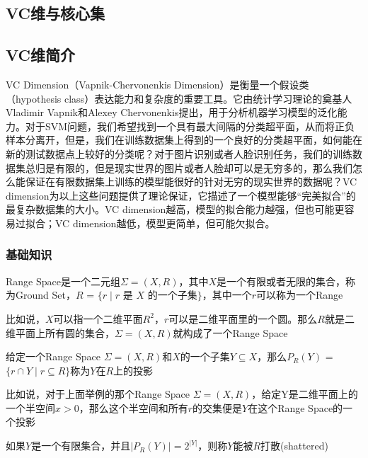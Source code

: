 \documentclass[lang=cn,newtx,10pt,scheme=chinese,chinesefont=nofont,citestyle=gb7714-2015, bibstyle=gb7714-2015]{elegantbook}
\begin{document}
\begin{refsection}
\chapter{VC维与核心集}
\section{VC维简介}
VC Dimension（Vapnik-Chervonenkis Dimension）是衡量一个假设类（hypothesis class）表达能力和复杂度的重要工具。它由统计学习理论的奠基人Vladimir Vapnik和Alexey Chervonenkis提出\cite{vapnik1971theory}，用于分析机器学习模型的泛化能力。对于SVM问题，我们希望找到一个具有最大间隔的分类超平面，从而将正负样本分离开，但是，我们在训练数据集上得到的一个良好的分类超平面，如何能在新的测试数据点上较好的分类呢？对于图片识别或者人脸识别任务，我们的训练数据集总归是有限的，但是现实世界的图片或者人脸却可以是无穷多的，那么我们怎么能保证在有限数据集上训练的模型能很好的针对无穷的现实世界的数据呢？VC dimension为以上这些问题提供了理论保证，它描述了一个模型能够“完美拟合”的最复杂数据集的大小。VC dimension越高，模型的拟合能力越强，但也可能更容易过拟合；VC dimension越低，模型更简单，但可能欠拟合。


\subsection{基础知识}

\begin{definition}
    Range Space是一个二元组$\Sigma = (X,R)$，其中$X$是一个有限或者无限的集合，称为Ground Set，$R$ = $\{ r \mid r \text{ 是 } X \text{ 的一个子集} \}$，其中一个$r$可以称为一个Range
\end{definition}

比如说，$X$可以指一个二维平面$R^2$，$r$可以是二维平面里的一个圆。那么$R$就是二维平面上所有圆的集合，$\Sigma = (X,R)$就构成了一个Range Space

\begin{definition}[投影]
    给定一个Range Space $\Sigma = (X,R)$和$X$的一个子集$Y \subseteq X$，那么$P_R(Y)$ = $\{ r \cap Y \mid r \subseteq R \}$称为$Y$在$R$上的投影
\end{definition}

比如说，对于上面举例的那个Range Space $\Sigma = (X,R)$，给定Y是二维平面上的一个半空间$x > 0$，那么这个半空间和所有$r$的交集便是$Y$在这个Range Space的一个投影

\begin{definition}[打散]
    如果$Y$是一个有限集合，并且$|P_{R}(Y)| = 2^{|Y|}$，则称$Y$能被$R$打散(shattered)
\end{definition}


\end{refsection}
\end{document}
